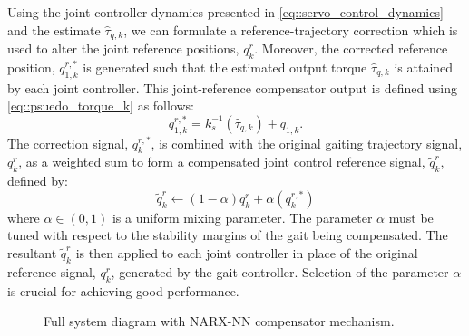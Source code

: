 			Using the joint controller dynamics presented in \ref{eq::servo_control_dynamics} and the estimate $\hat{\tau}_{q,k}$, we can formulate a reference-trajectory correction  which is used to alter the joint reference positions, ${q}_{k}^{r}$. Moreover, the corrected reference position, ${q}_{1,k}^{r,*}$ is generated such that the estimated output torque $\hat{\tau}_{q,k}$ is attained by each joint controller. This joint-reference compensator output is defined using 
			\ref{eq::psuedo_torque_k} as follows:
				\begin{equation}
				 	{q}_{1,k}^{r,*} 	= k_{s}^{-1}  \left(  \hat{\tau}_{q,k}  \right) +  {q}_{1,k}.
					\label{eq::correction_equation}
				\end{equation}
			The correction signal,  ${q}_{k}^{r,*}$, is combined with the original gaiting trajectory signal, ${q}_{k}^{r}$, as a weighted sum to form a compensated joint control reference signal, $\tilde{q}_{k}^{r}$, defined by:
				\begin{equation}
				 	\tilde{q}_{k}^{r} 	\leftarrow (1-\alpha) {q}_{k}^{r} + \alpha ( {q}_{k}^{r,*} )
					\label{eq::correction_application}
				\end{equation}
			where  $\alpha \in (0,1)$ is a uniform mixing parameter. The parameter $\alpha$ must be tuned with respect to the stability margins of the gait being compensated. The resultant $\tilde{q}_{k}^{r}$ is then applied  to each joint controller in place of the original reference signal,  ${q}_{k}^{r}$,  generated by the gait controller. Selection of the parameter $\alpha$ is crucial for achieving good performance. 

				\begin{figure}[!h]
					\centering
					\caption{Full system diagram with NARX-NN compensator mechanism.}
					\label{fig::sys_diagram}
				\end{figure}


